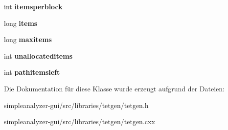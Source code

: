 \begin{DoxyCompactItemize}
\item 
\hypertarget{classtetgenmesh_1_1memorypool_a06ef9dbd1dec025a8c0475aaac348d3a}{int {\bfseries itemsperblock}}\label{classtetgenmesh_1_1memorypool_a06ef9dbd1dec025a8c0475aaac348d3a}

\item 
\hypertarget{classtetgenmesh_1_1memorypool_af29a38b2654a8d977dd24eea8dc72729}{long {\bfseries items}}\label{classtetgenmesh_1_1memorypool_af29a38b2654a8d977dd24eea8dc72729}

\item 
\hypertarget{classtetgenmesh_1_1memorypool_ae9dda5bafe91eed206b26fa7d7020716}{long {\bfseries maxitems}}\label{classtetgenmesh_1_1memorypool_ae9dda5bafe91eed206b26fa7d7020716}

\item 
\hypertarget{classtetgenmesh_1_1memorypool_aa8a5667ab1f55ec7ef852d378871b9ee}{int {\bfseries unallocateditems}}\label{classtetgenmesh_1_1memorypool_aa8a5667ab1f55ec7ef852d378871b9ee}

\item 
\hypertarget{classtetgenmesh_1_1memorypool_ad83a51d49f6e03ff38151b870a2f51dd}{int {\bfseries pathitemsleft}}\label{classtetgenmesh_1_1memorypool_ad83a51d49f6e03ff38151b870a2f51dd}

\end{DoxyCompactItemize}


Die Dokumentation für diese Klasse wurde erzeugt aufgrund der Dateien\-:\begin{DoxyCompactItemize}
\item 
simpleanalyzer-\/gui/src/libraries/tetgen/tetgen.\-h\item 
simpleanalyzer-\/gui/src/libraries/tetgen/tetgen.\-cxx\end{DoxyCompactItemize}
